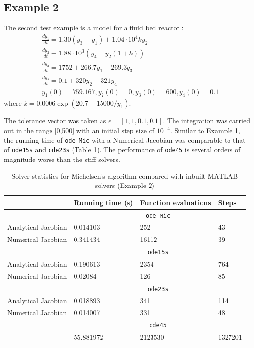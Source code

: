 \documentclass[letterpaper,12pt,onehalfspacing,twoside]{article}
\theoremstyle{msds}
\begin{document}
\subsection{Example 2}
The second test example is a model for a fluid bed reactor \citep{AIC:AIC690200225}:
\begin{equation}
\begin{aligned}
&\frac{dy_1}{dt} = 1.30 (y_3 - y_1) + 1.04 \cdot 10^4 k y_2\\
&\frac{dy_2}{dt} = 1.88 \cdot 10^3 (y_4 - y_2 (1 + k))\\
&\frac{dy_3}{dt} = 1752 + 266.7 y_1 - 269.3 y_3\\
&\frac{dy_4}{dt} = 0.1 + 320 y_2 - 321 y_4\\
&y_1(0) = 759.167, y_2(0) = 0, y_3(0) = 600, y_4(0) = 0.1
\end{aligned}
\end{equation}
where $k = 0.0006 \exp{(20.7 - 15000/y_1)}$. 

The tolerance vector was taken as $\epsilon = [1,1,0.1,0.1]$. The integration was carried out in the range [0,500] with an initial step size of $10^{-4}$. Similar to Example 1, the running time of \texttt{ode\_Mic} with a Numerical Jacobian was comparable to that of \texttt{ode15s} and \texttt{ode23s} (Table \ref{tab:ex2_solvers}). The performance of \texttt{ode45} is several orders of magnitude worse than the stiff solvers.

\begin{table}[htbp]
\centering
\caption{Solver statistics for Michelsen's algorithm compared with inbuilt MATLAB solvers (Example 2)}
\label{tab:ex2_solvers}
\begin{tabular}{@{}llll@{}}
\toprule
                    & Running time (s)   & Function evaluations    & Steps    \\ \midrule
                    & \multicolumn{3}{c}{\texttt{ode\_Mic}} \\ \cmidrule(l){2-4} 
Analytical Jacobian  & 0.014103       & 252       & 43       \\
Numerical Jacobian & 0.341434       & 16112     & 39       \\ \cmidrule(l){2-4} 
                    & \multicolumn{3}{c}{\texttt{ode15s}}   \\ \cmidrule(l){2-4} 
Analytical Jacobian  & 0.190613       & 2354      & 764      \\
Numerical Jacobian & 0.02084        & 126       & 85       \\ \cmidrule(l){2-4} 
                    & \multicolumn{3}{c}{\texttt{ode23s}}   \\ \cmidrule(l){2-4} 
Analytical Jacobian  & 0.018893       & 341       & 114      \\
Numerical Jacobian & 0.014007       & 331       & 48       \\ \cmidrule(l){2-4} 
                    & \multicolumn{3}{c}{\texttt{ode45}}    \\  \cmidrule(l){2-4} 
	 	       & 55.881972      & 2123530   & 1327201  \\ \bottomrule
\end{tabular}
\end{table}
\end{document}
